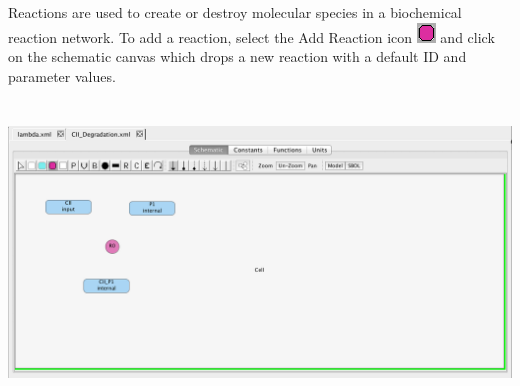 \documentclass[titlepage,11pt]{article}
\begin{document}
\noindent
Reactions are used to create or destroy molecular species in a biochemical reaction network.  
To add a reaction, select the Add Reaction icon \includegraphics{../gui/icons/modelview/add_reaction_selected} and click on the schematic canvas which drops a new reaction with a default ID and parameter values.  

\begin{center}
\includegraphics[height=80mm]{screenshots/reaction}
\end{center}
\end{document}
